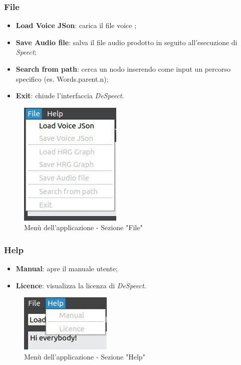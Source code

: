 \documentclass[openany,12pt,a4paper]{report}
\begin{document}
 	\subsubsection{File} 
 		\begin{itemize}
 			\item \textbf{Load Voice JSon}: carica il file voice ;
 			\item \textbf{Save Audio file}: salva il file audio prodotto in seguito all'esecuzione di \textit{Speect};
 			\item \textbf{Search from path}: cerca un nodo inserendo come input un percorso specifico (es. Words.parent.n);
 			\item \textbf{Exit}: chiude l'interfaccia \textit{DeSpeect}.
 		\end{itemize}
 		
 		\begin{figure}[H]
 			
 			\centering
 			
 			\includegraphics[width=.4\textwidth]{./img/menu_file}
 			
 			\caption{Menù dell'applicazione - Sezione "File"}
 			
 		\end{figure}
 	
 	\subsubsection{Help}
 		\begin{itemize}
 			\item \textbf{Manual}: apre il manuale utente;
 			\item \textbf{Licence}: visualizza la licenza di \textit{DeSpeect}.
 		\end{itemize}
 		\begin{figure}[H]
 			
 			\centering
 			
 			\includegraphics[width=.4\textwidth]{./img/menu_help}
 			
 			\caption{Menù dell'applicazione - Sezione "Help"}
 			
 		\end{figure}
 	
\end{document}
